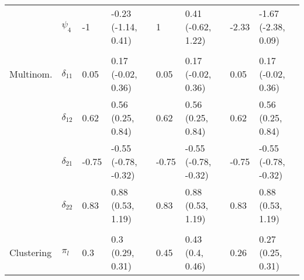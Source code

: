\documentclass[]{article}
\begin{document}
\begin{table}[t]
\begin{tabular}{llllllll}
\hspace{1em} & $\psi_{4}$ & -1 & -0.23 (-1.14, 0.41) & 1 & 0.41 (-0.62, 1.22) & -2.33 & -1.67 (-2.38, 0.09)\\
\addlinespace[0.3em]
\multicolumn{8}{l}{\textbf{ }}\\
\hspace{1em}Multinom. & $\delta_{11}$ & 0.05 & 0.17 (-0.02, 0.36) & 0.05 & 0.17 (-0.02, 0.36) & 0.05 & 0.17 (-0.02, 0.36)\\
\hspace{1em} & $\delta_{12}$ & 0.62 & 0.56 (0.25, 0.84) & 0.62 & 0.56 (0.25, 0.84) & 0.62 & 0.56 (0.25, 0.84)\\
\hspace{1em} & $\delta_{21}$ & -0.75 & -0.55 (-0.78, -0.32) & -0.75 & -0.55 (-0.78, -0.32) & -0.75 & -0.55 (-0.78, -0.32)\\
\hspace{1em} & $\delta_{22}$ & 0.83 & 0.88 (0.53, 1.19) & 0.83 & 0.88 (0.53, 1.19) & 0.83 & 0.88 (0.53, 1.19)\\
\addlinespace[0.3em]
\multicolumn{8}{l}{\textbf{ }}\\
\hspace{1em}Clustering & $\pi_l$ & 0.3 & 0.3 (0.29, 0.31) & 0.45 & 0.43 (0.4, 0.46) & 0.26 & 0.27 (0.25, 0.31)\\
\bottomrule
\end{tabular}
\end{table}
\end{document}
